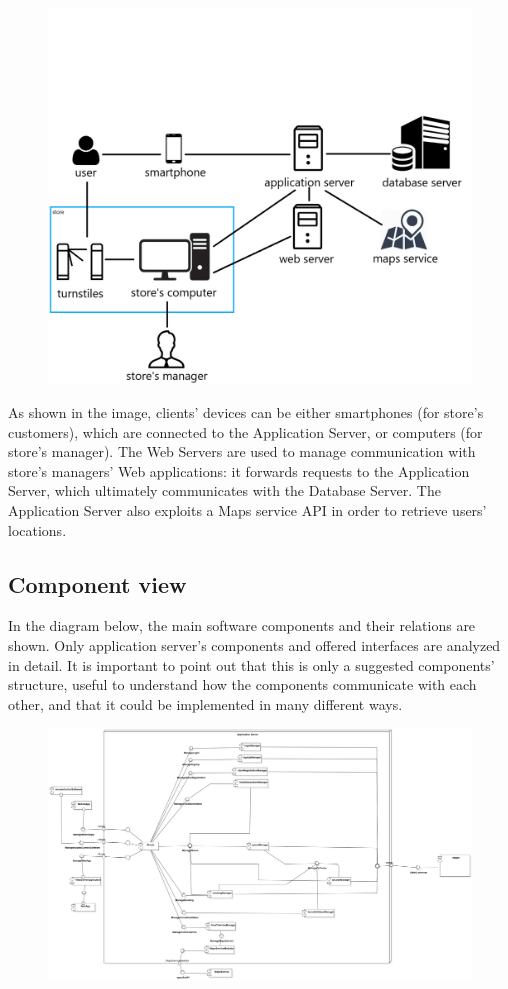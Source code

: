 \documentclass{article}
\begin{document}
\smallskip\\
\begin{figure}[H]
  \includegraphics[width=\linewidth]{highArchitecture.png}
  
\end{figure}
As shown in the image, clients’ devices can be either smartphones (for store’s customers), which are connected to the Application Server, or computers (for store’s manager). The Web Servers are used to manage communication with store’s managers’ Web applications: it forwards requests to the Application Server, which ultimately communicates with the Database Server. The Application Server also exploits a Maps service API in order to retrieve users’ locations.
\subsection{Component view}
In the diagram below, the main software components and their relations are shown. Only application server's
components and offered interfaces are analyzed in detail. It is important to point out that this is only a
suggested components' structure, useful to understand how the components communicate with each other,
and that it could be implemented in many different ways.
\begin{figure}[H]
  \includegraphics[width=\linewidth]{ComponentDiagram.png}
  
\end{figure}
\end{document}
